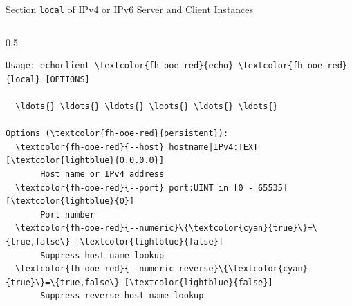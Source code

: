 \begin{frame}[fragile]{Section \alert{\lstinline|local|} of IPv4 or IPv6 Server and Client Instances}
\begin{columns}[T, onlytextwidth]
\begin{column}{0.5\textwidth}
\begin{scriptsize}
\begin{Verbatim}[commandchars=\\\{\},frame=leftline,rulecolor=\color{fh-ooe-red}]
Usage: echoclient \textcolor{fh-ooe-red}{echo} \textcolor{fh-ooe-red}{local} [OPTIONS]

  \ldots{} \ldots{} \ldots{} \ldots{} \ldots{} \ldots{}

Options (\textcolor{fh-ooe-red}{persistent}):
  \textcolor{fh-ooe-red}{--host} hostname|IPv4:TEXT [\textcolor{lightblue}{0.0.0.0}]
       Host name or IPv4 address
  \textcolor{fh-ooe-red}{--port} port:UINT in [0 - 65535] [\textcolor{lightblue}{0}]
       Port number
  \textcolor{fh-ooe-red}{--numeric}\{\textcolor{cyan}{true}\}=\{true,false\} [\textcolor{lightblue}{false}]
       Suppress host name lookup
  \textcolor{fh-ooe-red}{--numeric-reverse}\{\textcolor{cyan}{true}\}=\{true,false\} [\textcolor{lightblue}{false}]
       Suppress reverse host name lookup
\end{Verbatim}
\end{scriptsize}
\end{column}
\end{columns}
\end{frame}
